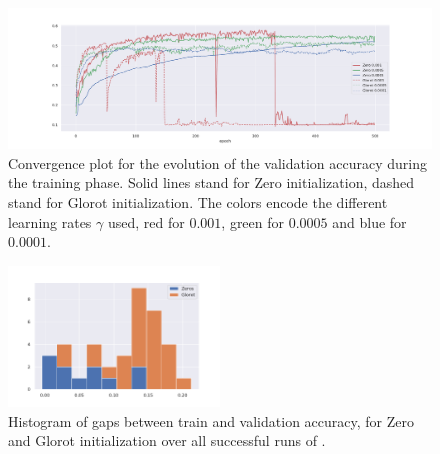 \begin{figure}[h]
  \centering
		\includegraphics[width=1.0\textwidth]{zeros-vs-glorot}
      \caption{Convergence plot for the evolution of the validation accuracy during the training phase. Solid lines stand for Zero initialization, dashed stand for Glorot initialization. The colors encode the different learning rates $\gamma$ used, red for $0.001$, green for $0.0005$ and blue for $0.0001$.}
\label{fig:zeroConvergence}
\end{figure}

\begin{figure}[h!]
\centering
    \includegraphics[width=0.5\textwidth]{zeros-vs-glorot-val-difference}
      \caption{Histogram of gaps between train and validation accuracy, for Zero and Glorot initialization over all successful runs of \cifar.}
		\label{fig:ZeroVsGlorotDifference}


\end{figure}

